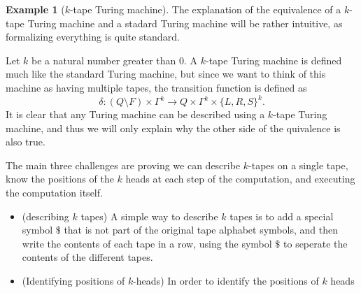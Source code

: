 \documentclass[11pt,a4paper]{article}
\theoremstyle{definition}
\newtheorem{example}{Example}[section]
\theoremstyle{plain}
\begin{document}
  \begin{example}[$k$-tape Turing machine]
    The explanation of the equivalence of a $k$-tape Turing machine and
    a stadard Turing machine will be rather intuitive, as formalizing
    everything is quite standard.

    Let $k$ be a natural number greater than $0$.
    A $k$-tape Turing machine is defined much like the standard Turing
    machine, but since we want to think of this machine as having
    multiple tapes, the transition function is defined as
    \[
      \delta \colon (Q \setminus F) \times \Gamma^k \to
      Q \times \Gamma^k \times \{L, R, S\}^k.
    \]
    It is clear that any Turing machine can be described using a $k$-tape
    Turing machine, and thus we will only explain why the other side of
    the quivalence is also true.

    The main three challenges are proving we can describe $k$-tapes
    on a single tape, know the positions of the $k$ heads at each step
    of the computation, and executing the computation itself.
    \begin{itemize}
      \item (describing $k$ tapes) A simple way to describe $k$ tapes
        is to add a special symbol $\$$ that is not part of the original
        tape alphabet symbols, and then write the contents of each tape
        in a row, using the symbol $\$$ to seperate the contents of the
        different tapes.
      \item (Identifying positions of $k$-heads) In order to identify the 
        positions of $k$ heads 
    \end{itemize}
  \end{example}
\end{document}
